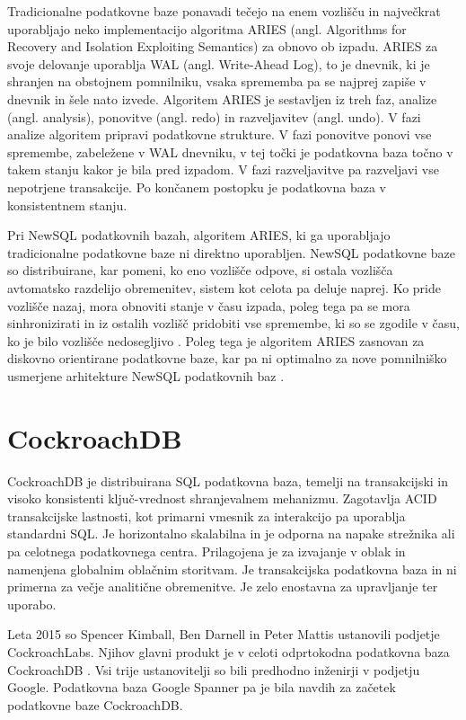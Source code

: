 \documentclass[a4paper, 12pt]{book}
\begin{document}
Tradicionalne podatkovne baze ponavadi tečejo na enem vozlišču in naj\-več\-krat uporabljajo neko implementacijo algoritma ARIES (angl. Algorithms for Recovery and Isolation Exploiting Semantics) za obnovo ob izpadu. ARIES za svoje delovanje uporablja WAL (angl. Write-Ahead Log), to je dnevnik, ki je shranjen na obstojnem pomnilniku, vsaka sprememba pa se najprej zapiše v dnevnik in šele nato izvede. Algoritem ARIES je sestavljen iz treh faz, analize (angl. analysis), ponovitve (angl. redo) in razveljavitev (angl. undo). V fazi analize algoritem pripravi podatkovne strukture. V fazi ponovitve ponovi vse spremembe, zabeležene v WAL dnevniku, v tej točki je podatkovna baza točno v takem stanju kakor je bila pred izpadom. V fazi razveljavitve pa razveljavi vse nepotrjene transakcije. Po končanem postopku je podatkovna baza v konsistentnem stanju. \cite{Pavlo2016Sep}

Pri NewSQL podatkovnih bazah, algoritem ARIES, ki ga uporabljajo tradicionalne podatkovne baze ni direktno uporabljen. NewSQL podatkovne baze so distribuirane, kar pomeni, ko eno vozlišče odpove, si ostala vozlišča avtomatsko razdelijo obremenitev, sistem kot celota pa deluje naprej. Ko pride vozlišče nazaj, mora obnoviti stanje v času izpada, poleg tega pa se mora sinhronizirati in iz ostalih vozlišč pridobiti vse spremembe, ki so se zgodile v času, ko je bilo vozlišče nedosegljivo \cite{Pavlo2016Sep}. Poleg tega je algoritem ARIES zasnovan za diskovno orientirane podatkovne baze, kar pa ni optimalno za nove pomnilniško usmerjene arhitekture NewSQL podatkovnih baz \cite{zheng2014fast}.




\chapter{CockroachDB}

CockroachDB je distribuirana SQL podatkovna baza, temelji na transakcijski in visoko konsistenti ključ-vrednost shranjevalnem mehanizmu. Zagotavlja ACID transakcijske lastnosti, kot primarni vmesnik za interakcijo pa uporablja standardni SQL. Je horizontalno skalabilna in je odporna na napake strežnika ali pa celotnega podatkovnega centra. Prilagojena je za izvajanje v oblak in namenjena globalnim oblačnim storitvam. Je transakcijska podatkovna baza in ni primerna za večje analitične obremenitve. Je zelo enostavna za upravljanje ter uporabo. \cite{CRDB-FAQ}

Leta 2015 so Spencer Kimball, Ben Darnell in Peter Mattis ustanovili podjetje CockroachLabs. Njihov glavni produkt je v celoti odprtokodna podatkovna baza CockroachDB \cite{cockroachdb/cockroach}. Vsi trije ustanovitelji so bili predhodno inženirji v podjetju Google. Podatkovna baza Google Spanner pa je bila navdih za začetek podatkovne baze CockroachDB. \cite{CRDB-2017}
\end{document}
